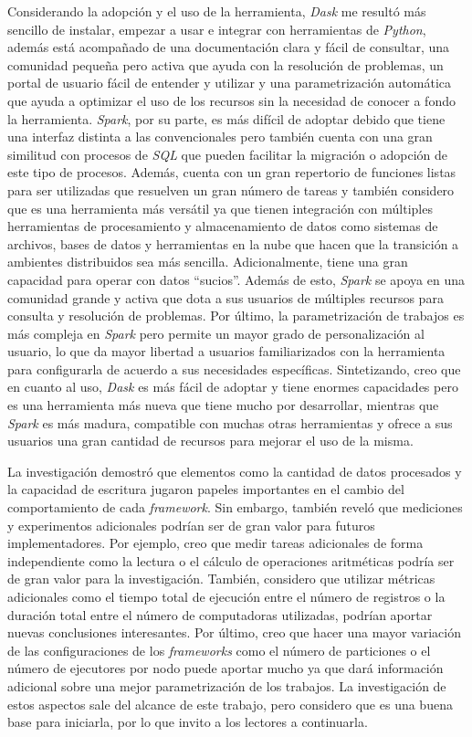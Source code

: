 Considerando la adopción y el uso de la herramienta, \textit{Dask} me resultó más sencillo de instalar, empezar a usar e integrar con herramientas de \textit{Python}, además está acompañado de una documentación clara y fácil de consultar, una comunidad pequeña pero activa que ayuda con la resolución de problemas, un portal de usuario fácil de entender y utilizar y una parametrización automática que ayuda a optimizar el uso de los recursos sin la necesidad de conocer a fondo la herramienta. \textit{Spark}, por su parte, es más difícil de adoptar debido que tiene una interfaz distinta a las convencionales pero también cuenta con una gran similitud con procesos de \textit{SQL} que pueden facilitar la migración o adopción de este tipo de procesos. Además, cuenta con un gran repertorio de funciones listas para ser utilizadas que resuelven un gran número de tareas y también considero que es una herramienta más versátil ya que tienen integración con múltiples herramientas de procesamiento y almacenamiento de datos como sistemas de archivos, bases de datos y herramientas en la nube que hacen que la transición a ambientes distribuidos sea más sencilla. Adicionalmente, tiene una gran capacidad para operar con datos ``sucios''. Además de esto, \textit{Spark} se apoya en una comunidad grande y activa que dota a sus usuarios de múltiples recursos para consulta y resolución de problemas. Por último, la parametrización de trabajos es más compleja en \textit{Spark} pero permite un mayor grado de personalización al usuario, lo que da mayor libertad a usuarios familiarizados con la herramienta para configurarla de acuerdo a sus necesidades específicas. Sintetizando, creo que en cuanto al uso, \textit{Dask} es más fácil de adoptar y tiene enormes capacidades pero es una herramienta más nueva que tiene mucho por desarrollar, mientras que \textit{Spark} es más madura, compatible con muchas otras herramientas y ofrece a sus usuarios una gran cantidad de recursos para mejorar el uso de la misma.

La investigación demostró que elementos como la cantidad de datos procesados y la capacidad de escritura jugaron papeles importantes en el cambio del comportamiento de cada \textit{framework}. Sin embargo, también reveló que mediciones y experimentos adicionales podrían ser de gran valor para futuros implementadores. Por ejemplo, creo que medir tareas adicionales de forma independiente como la lectura o el cálculo de operaciones aritméticas podría ser de gran valor para la investigación. También, considero que utilizar métricas adicionales como el tiempo total de ejecución entre el número de registros o la duración total entre el número de computadoras utilizadas, podrían aportar nuevas conclusiones interesantes. Por último, creo que hacer una mayor variación de las configuraciones de los \textit{frameworks} como el número de particiones o el número de ejecutores por nodo puede aportar mucho ya que dará información adicional sobre una mejor parametrización de los trabajos. La investigación de estos aspectos sale del alcance de este trabajo, pero considero que es una buena base para iniciarla, por lo que invito a los lectores a continuarla.

